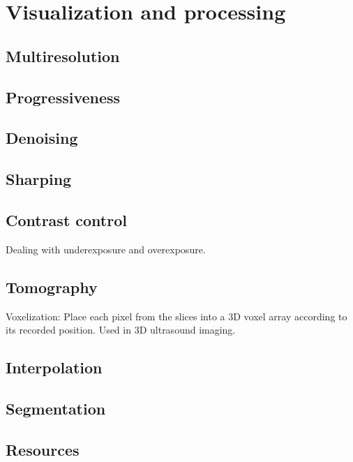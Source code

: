 \documentclass{report}%
\begin{document}
\chapter{Visualization and processing}

\section{Multiresolution}
\section{Progressiveness}
\section{Denoising}
\section{Sharping}
\section{Contrast control}
Dealing with underexposure and overexposure.

\section{Tomography}
Voxelization: Place each pixel from the slices into a 3D voxel array according to its recorded position. Used in 3D ultrasound imaging.
\section{Interpolation}
\section{Segmentation}


\printglossary[type=\acronymtype]

\section*{Resources}



\end{document}
